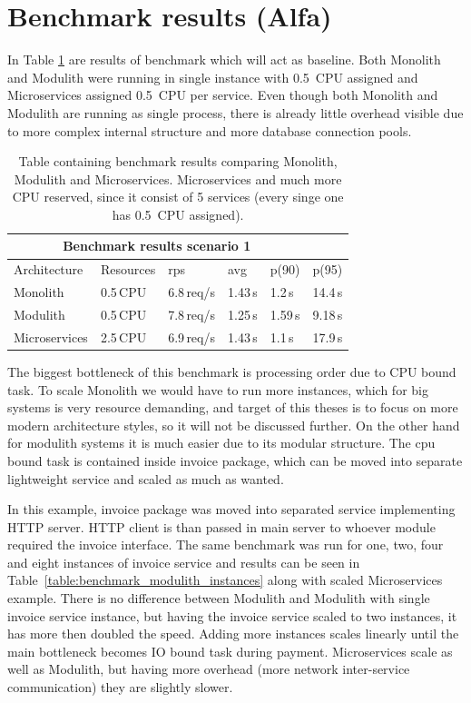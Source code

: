\section{Benchmark results (Alfa)}

In Table \ref{table:benchmark_baseline} are results of benchmark which will act as baseline. Both Monolith and Modulith were running in single instance with 0.5~CPU assigned and Microservices assigned 0.5~CPU per service. Even though both Monolith and Modulith are running as single process, there is already little overhead visible due to more complex internal structure and more database connection pools.

\begin{table}
    \begin{tabular}{ |p{3cm}||p{3cm}|p{1.5cm}|p{1.5cm}|p{1.5cm}|p{1.5cm}| }
        \hline
        \multicolumn{5}{|c|}{Benchmark results scenario 1}                   \\
        \hline
        Architecture  & Resources & rps        & avg     & p(90)   & p(95)   \\
        \hline
        Monolith      & 0.5\,CPU  & 6.8\,req/s & 1.43\,s & 1.2\,s  & 14.4\,s \\
        Modulith      & 0.5\,CPU  & 7.8\,req/s & 1.25\,s & 1.59\,s & 9.18\,s \\
        Microservices & 2.5\,CPU  & 6.9\,req/s & 1.43\,s & 1.1\,s  & 17.9\,s \\
        \hline
    \end{tabular}
    \caption{Table containing benchmark results comparing Monolith, Modulith and Microservices. Microservices and much more CPU reserved, since it consist of 5 services (every singe one has 0.5~CPU assigned).\label{table:benchmark_baseline}}
\end{table}

The biggest bottleneck of this benchmark is processing order due to CPU bound task. To scale Monolith we would have to run more instances, which for big systems is very resource demanding, and target of this theses is to focus on more modern architecture styles, so it will not be discussed further. On the other hand for modulith systems it is much easier due to its modular structure. The cpu bound task is contained inside invoice package, which can be moved into separate lightweight service and scaled as much as wanted.

In this example, invoice package was moved into separated service implementing HTTP server. HTTP client is than passed in main server to whoever module required the invoice interface. The same benchmark was run for one, two, four and eight instances of invoice service and results can be seen in Table~\ref{table:benchmark_modulith_instances} along with scaled Microservices example. There is no difference between Modulith and Modulith with single invoice service instance, but having the invoice service scaled to two instances, it has more then doubled the speed. Adding more instances scales linearly until the main bottleneck becomes IO bound task during payment. Microservices scale as well as Modulith, but having more overhead (more network inter-service communication) they are slightly slower.

